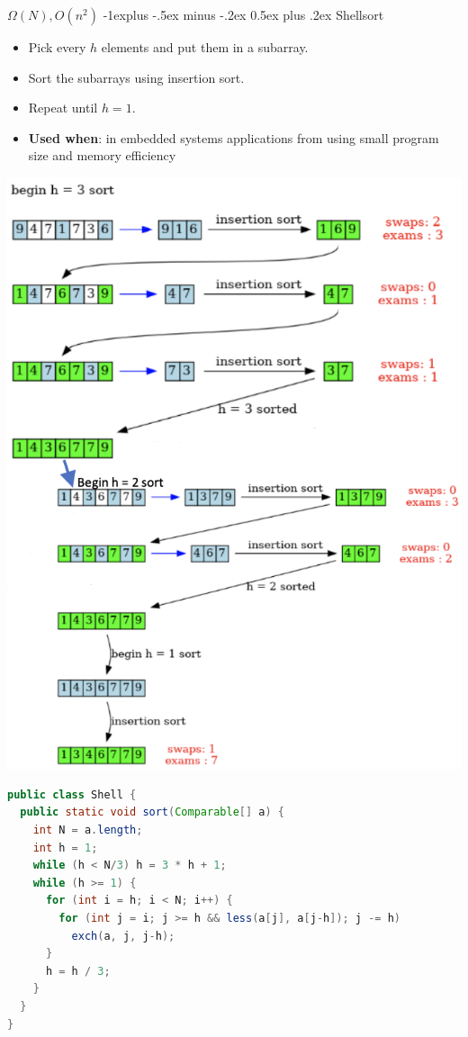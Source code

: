 \documentclass[letterpaper, 8pt]{extarticle}
\makeatletter
\renewcommand{\subsection}{\@startsection{subsection}{2}{0mm}%
                                {-1explus -.5ex minus -.2ex}%
                                {0.5ex plus .2ex}%
                                {\normalfont\small\bfseries}}
\makeatother
\begin{document}
\begin{multicols*}{4}
  $\Omega(N), O(n^2)$
  \subsection{Shellsort}
  \begin{itemize}
    \item
      Pick every $h$ elements and put them in a subarray.
    \item
      Sort the subarrays using insertion sort.
    \item
      Repeat until $h = 1$.
    \item
      \textbf{Used when}: in embedded systems applications from
      using small program size and memory efficiency
  \end{itemize}
  \begin{center}
    \includegraphics[width=\linewidth]{shellsort.png}
  \end{center}
  \begin{lstlisting}[language=Java, breaklines=true, postbreak=\mbox{\textcolor{red}{$\hookrightarrow$}\space}]
public class Shell {
  public static void sort(Comparable[] a) {
    int N = a.length;
    int h = 1;
    while (h < N/3) h = 3 * h + 1;
    while (h >= 1) {
      for (int i = h; i < N; i++) {
        for (int j = i; j >= h && less(a[j], a[j-h]); j -= h)
          exch(a, j, j-h);
      }
      h = h / 3;
    }
  }
}
  \end{lstlisting}


\end{multicols*}
\end{document}
